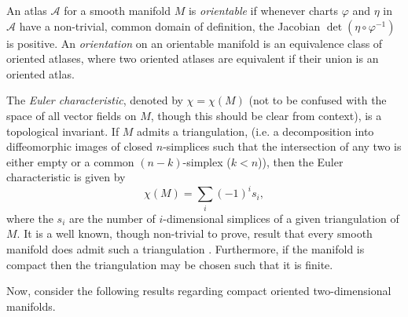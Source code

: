 \documentclass[12pt,a4paper]{article}
\begin{document}
\begin{definition}
An atlas $\mathcal{A}$ for a smooth manifold $M$ is \textit{orientable} if whenever charts $\varphi$ and $\eta$ in $\mathcal{A}$ have a non-trivial, common domain of definition, the Jacobian $\det(\eta\circ\varphi^{-1})$ is positive. An \textit{orientation} on an orientable manifold is an equivalence class of oriented atlases, where two oriented atlases are equivalent if their union is an oriented atlas.
\end{definition}
\begin{definition}
The \textit{Euler characteristic}, denoted by $\chi=\chi(M)$ (not to be confused with the space of all vector fields on $M$, though this should be clear from context), is a topological invariant. If $M$ admits a triangulation, (i.e. a decomposition into diffeomorphic images of closed $n$-simplices such that the intersection of any two is either empty or a common $(n-k)$-simplex ($k<n$)), then the Euler characteristic is given by
\[
\chi(M)=\sum_i(-1)^is_i,
\] 
where the $s_i$ are the number of $i$-dimensional simplices of a given triangulation of $M$.
It is a well known, though non-trivial to prove, result that every smooth manifold does admit such a triangulation \cite{whitehead1940c1}. Furthermore, if the manifold is compact then the triangulation may be chosen such that it is finite.
\end{definition}

Now, consider the following results regarding compact oriented two-dimensional manifolds.
\end{document}

